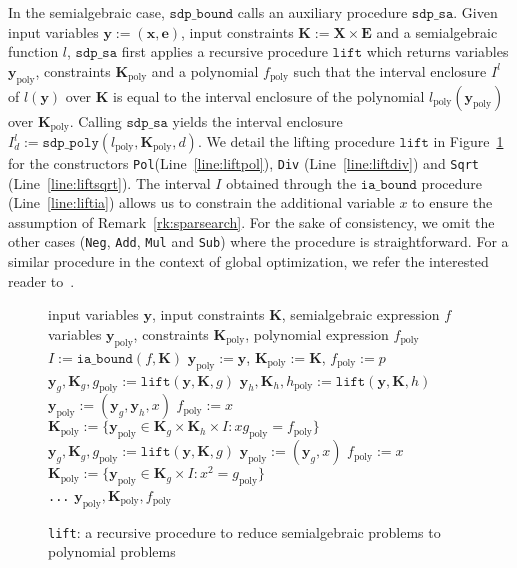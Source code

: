 \documentclass[preprint,fleqn,nocopyrightspace]{sigplanconf}
\newcommand{\code}[1]{\lstinline{#1}}
\newcommand{\x}{\mathbf{x}}
\newcommand{\e}{\mathbf{e}}
\newcommand{\y}{\mathbf{y}}
\newcommand{\f}{\mathbf{f}}
\def\f{f}
\def\E{\mathbf{E}}
\def\K{\mathbf{K}}
\def\X{\mathbf{X}}
\newcommand{\iaboundfun}[2]{\mathtt{ia\_bound}(#1, #2)}
\newcommand{\iabound}{\mathtt{ia\_bound}}
\newcommand{\sdpbound}{\mathtt{sdp\_bound}}
\newcommand{\sdppolyfun}[3]{\mathtt{sdp\_poly}(#1, #2, #3)}
\newcommand{\liftfun}[3]{\mathtt{lift}(#1, #2, #3)}
\newcommand{\lift}{\mathtt{lift}}
\newcommand{\poly}{_\text{poly}}
\newcommand{\sdpsa}{\mathtt{sdp\_sa}}
\theoremstyle{plain}
\begin{document}
In the semialgebraic case, $\sdpbound$ calls an auxiliary procedure $\sdpsa$. 
Given input variables $\y := (\x,\e)$, input constraints $\K := \X \times \E$ and a 
semialgebraic function $l$,  $\sdpsa$ first applies a recursive procedure $\lift$ 
which returns variables $\y\poly$, constraints $\K\poly$ and a polynomial $f\poly$ such that the 
interval enclosure $I^l$ of $l(\y)$ over $\K$ is equal to the interval enclosure of 
the polynomial $l\poly(\y\poly)$ over $\K\poly$. 
Calling $\sdpsa$ yields the interval enclosure $I^l_d := \sdppolyfun{l\poly}{\K\poly}{d}$. We detail the lifting procedure $\lift$ in Figure~\ref{alg:lift} for the constructors \code{Pol}(Line~\eqref{line:liftpol}), \code{Div} (Line~\eqref{line:liftdiv}) and \code{Sqrt} (Line~\eqref{line:liftsqrt}). 
The interval $I$ obtained through the $\iabound$ procedure (Line~\eqref{line:liftia}) allows us to constrain the additional variable $x$ to ensure the assumption of Remark~\ref{rk:sparsearch}.
For the sake of consistency, we omit the other cases (\code{Neg}, \code{Add}, \code{Mul} and \code{Sub}) where the procedure is straightforward. For a similar procedure in the context of global optimization, we refer the interested reader to~\cite[Chapter 2]{MagronPhD}.

\begin{figure}[!ht]
\begin{algorithmic}[1]                 
\Require input variables $\y$, input constraints $\K$, semialgebraic expression $f$
\Ensure variables $\y\poly$, constraints $\K\poly$, polynomial expression $f\poly$
    \State $I := \iaboundfun{f}{\K}$ \label{line:liftia}
	 \label{line:liftpol} $\y\poly := \y$, $\K\poly := \K$, $\f\poly := p$
	 \label{line:liftdiv} 
	\State $\y_g, \K_g, g\poly := \liftfun{\y}{\K}{g}$ 
	\State $\y_h, \K_h, h\poly := \liftfun{\y}{\K}{h}$
    \State $\y\poly := (\y_g,\y_h,x)$ \hspace{1cm} $f\poly := x$ 
	\State $\K\poly := \{\y\poly \in \K_g \times \K_h \times I : x g\poly = f\poly \}$
	 \label{line:liftsqrt} 
	\State $\y_g, \K_g, g\poly := \liftfun{\y}{\K}{g}$ 
	\State $\y\poly := (\y_g,x)$ \hspace{1cm} $f\poly := x$ 
	\State $\K\poly := \{\y\poly \in \K_g \times I : x^2 = g\poly \}$\\
\code{...}
	\EndIf
%
\State \Return $\y\poly, \K\poly, f\poly$
\end{algorithmic}
\caption{\code{lift}: a recursive procedure to reduce semialgebraic problems to polynomial problems}
\label{alg:lift}
\end{figure}
\end{document}
